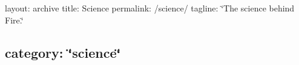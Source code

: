 

 layout\+: archive title\+: Science permalink\+: /science/ tagline\+: \char`\"{}\+The science behind Fire.\char`\"{} \subsection*{category\+: \char`\"{}science\char`\"{} }